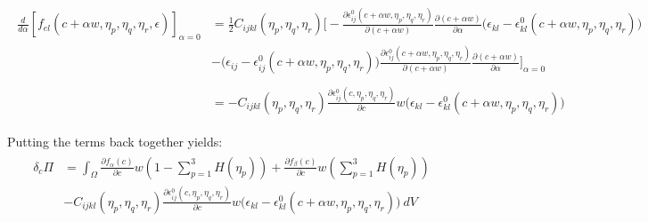 \documentclass[11pt]{article}
\renewcommand{\=}[1]{\stackrel{#1}{=}} %
\theoremstyle{definition}
\theoremstyle{remark}
\begin{document}
\begin{align}
\begin{split}
\frac{d}{d\alpha} \left[ f_{el}(c+\alpha w,\eta_p,\eta_q,\eta_r,\epsilon)\right]_{\alpha=0} &= \frac{1}{2} C_{ijkl}(\eta_p,\eta_q,\eta_r)  \bigg[ -\frac{\partial \epsilon_{ij}^0 (c+\alpha w,\eta_p,\eta_q,\eta_r)}{\partial (c + \alpha w)} \frac{\partial(c + \alpha w)}{\partial \alpha} \big(\epsilon_{kl}-\epsilon_{kl}^0 (c+\alpha w,\eta_p,\eta_q,\eta_r)\big)  \\ 
&- \big(\epsilon_{ij}-\epsilon_{ij}^0 (c+\alpha w,\eta_p,\eta_q,\eta_r)\big) \frac{\partial \epsilon_{ij}^0 (c+\alpha w,\eta_p,\eta_q,\eta_r)}{\partial (c + \alpha w)} \frac{\partial(c + \alpha w)}{\partial \alpha} \bigg]_{\alpha=0} \\
\\
&= -C_{ijkl}(\eta_p,\eta_q,\eta_r) \frac{\partial \epsilon_{ij}^0 (c,\eta_p,\eta_q,\eta_r)}{\partial c} w \big(\epsilon_{kl}-\epsilon_{kl}^0 (c+\alpha w,\eta_p,\eta_q,\eta_r)\big)
\end{split}
\end{align}

Putting the terms back together yields:
\begin{gather}
\begin{split}
\delta_{c} \Pi  &=  \int_{\Omega}  \frac{\partial f_{\alpha}(c)}{\partial c} w \left(1-\sum_{p=1}^3 H(\eta_p)\right) +\frac{\partial f_{\beta}(c)}{\partial c} w \left(\sum_{p=1}^3 H(\eta_p)\right) \\
&-C_{ijkl}(\eta_p,\eta_q,\eta_r) \frac{\partial \epsilon_{ij}^0 (c,\eta_p,\eta_q,\eta_r)}{\partial c} w \big(\epsilon_{kl}-\epsilon_{kl}^0 (c+\alpha w,\eta_p,\eta_q,\eta_r)\big) ~dV
\end{split}
\end{gather}
\end{document}
